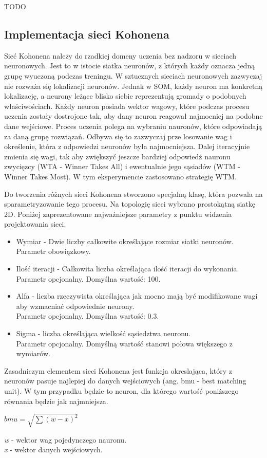 \documentclass[12pt, notitlepage]{article}
\begin{document}
TODO

\subsection{Implementacja sieci Kohonena}

Sieć Kohonena należy do rzadkiej domeny uczenia bez nadzoru w sieciach neuronowych. Jest to w istocie siatka neuronów, z których każdy oznacza jedną grupę wyuczoną podczas treningu. W sztucznych sieciach neuronowych zazwyczaj nie rozważa się lokalizacji neuronów. Jednak w SOM, każdy neuron ma konkretną lokalizację, a neurony leżące blisko siebie reprezentują gromady o podobnych właściwościach. Każdy neuron posiada wektor wagowy, które podczas procesu uczenia zostały dostrojone tak, aby dany neuron reagował najmocniej na podobne dane wejściowe. Proces uczenia polega na wybraniu nauronów, które odpowiadają za daną grupę rozwiązań. Odbywa się to zazwyczaj prze losowanie wag i określenie, która z odpowiedzi neuronów była najmocniejsza. Dalej iteracyjnie zmienia się wagi, tak aby zwiększyć jeszcze bardziej odpowiedź nauronu zwycięzcy (WTA - Winner Takes All) i ewentualnie jego sąsiadów (WTM - Winner Takes Most). W tym eksperymencie zastosowano strategię WTM.

Do tworzenia różnych sieci Kohonena stworzono specjalną klasę, która pozwala na sparametryzowanie tego procesu. Na topologię sieci wybrano prostokątną siatkę 2D. Poniżej zaprezentowane najważniejsze parametry z punktu widzenia projektowania sieci.
\begin{itemize}
    \item Wymiar - Dwie liczby całkowite określające rozmiar siatki neuronów. 
    \\Parametr obowiązkowy.
    \item Ilość iteracji - Całkowita liczba określająca ilość iteracji do wykonania.
    \\Parametr opcjonalny. Domyślna wartość: 100.
    \item Alfa - liczba rzeczywista określająca jak mocno mają być modifikowane wagi aby wzmacniać odpowiednie neurony.
    \\Parametr opcjonalny. Domyślna wartość: 0.3.
    \item Sigma - liczba określająca wielkość sąsiedztwa neuronu.
    \\ Parametr opcjonalny. Domyślną wartość stanowi połowa większego z wymiarów.
\end{itemize}

Zasadniczym elementem sieci Kohonena jest funkcja okreslająca, który z neuronów pasuje najlepiej do danych wejściowych (ang. bmu - best matching unit). W tym przypadku będzie to neuron, dla którego wartość poniższego równania będzie jak najmniejsza.
\begin{center}
    $ bmu = \sqrt{\sum (w - x)^2} $ \\
\end{center}
\textit{w} - wektor wag pojedynczego nauronu. \\
\textit{x} - wektor danych wejściowych.
\end{document}
